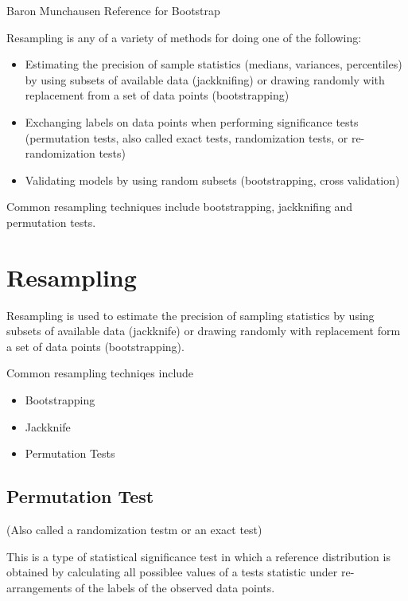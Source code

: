 Baron Munchausen Reference for Bootstrap


Resampling is any of a variety of methods for doing one of the following:

\begin{itemize}
\item Estimating the precision of sample statistics (medians, variances, percentiles) by using subsets of available data (jackknifing) or drawing randomly with replacement from a set of data points (bootstrapping)
\item Exchanging labels on data points when performing significance tests (permutation tests, also called exact tests, randomization tests, or re-randomization tests)
\item Validating models by using random subsets (bootstrapping, cross validation)
\end{itemize}

Common resampling techniques include bootstrapping, jackknifing and permutation tests.

\section{Resampling}

Resampling is used to estimate the precision of sampling statistics by using subsets of available data (jackknife) or drawing randomly with replacement form a set of data points (bootstrapping).

Common resampling techniqes include

\begin{itemize}
\item Bootstrapping
\item Jackknife
\item Permutation Tests
\end{itemize}

\subsection{Permutation Test}

(Also called a randomization testm or an exact test)

This is a type of statistical significance test in which a reference distribution is obtained by 
calculating all possiblee values of a tests statistic under re-arrangements of the labels of the observed data points.

